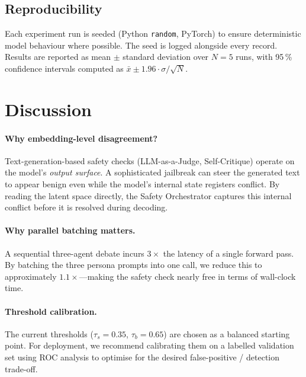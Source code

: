 \documentclass[12pt,a4paper]{article}
\begin{document}
\subsection{Reproducibility}

Each experiment run is seeded (Python \texttt{random}, PyTorch) to
ensure deterministic model behaviour where possible.  The seed is logged
alongside every record.  Results are reported as mean $\pm$ standard
deviation over $N=5$ runs, with 95\,\% confidence intervals computed as
$\bar{x} \pm 1.96 \cdot \sigma / \sqrt{N}$.


\section{Discussion}
\label{sec:discussion}

\paragraph{Why embedding-level disagreement?}
Text-generation-based safety checks (LLM-as-a-Judge, Self-Critique)
operate on the model's \emph{output surface}.  A sophisticated jailbreak
can steer the generated text to appear benign even while the model's
internal state registers conflict.  By reading the latent space
directly, the Safety Orchestrator captures this internal conflict before
it is resolved during decoding.

\paragraph{Why parallel batching matters.}
A sequential three-agent debate incurs $3\times$ the latency of a single
forward pass.  By batching the three persona prompts into one call, we
reduce this to approximately $1.1\times$---making the safety check
nearly free in terms of wall-clock time.

\paragraph{Threshold calibration.}
The current thresholds ($\tau_s = 0.35$, $\tau_b = 0.65$) are chosen as
a balanced starting point.  For deployment, we recommend calibrating
them on a labelled validation set using ROC analysis to optimise for the
desired false-positive / detection trade-off.
\end{document}

